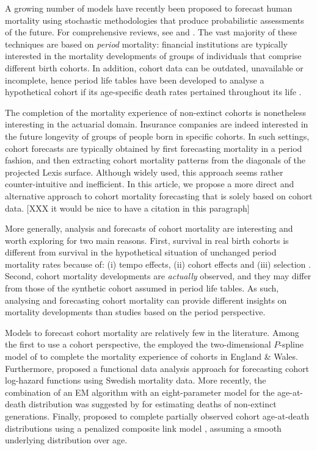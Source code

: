 \documentclass[11pt, a4paper]{article}
\begin{document}
A growing number of models have recently been proposed to forecast human mortality using stochastic methodologies that produce probabilistic assessments of the future. For comprehensive reviews, see \cite{booth2006demographic} and \cite{shang2011point}. The vast majority of these techniques are based on \textit{period} mortality: financial institutions are typically interested in the mortality developments of groups of individuals that comprise different birth cohorts. In addition, cohort data can be outdated, unavailable or incomplete, hence period life tables have been developed to analyse a hypothetical cohort if its age-specific death rates pertained throughout its life \citep{preston2001demogr}.
 
The completion of the mortality experience of non-extinct cohorts is nonetheless interesting in the actuarial domain. Insurance companies are indeed interested in the future longevity of groups of people born in specific cohorts. In such settings, cohort forecasts are typically obtained by first forecasting mortality in a period fashion, and then extracting cohort mortality patterns from the diagonals of the projected Lexis surface. Although widely used, this approach seems rather counter-intuitive and inefficient. In this article, we propose a more direct and alternative approach to cohort mortality forecasting that is solely based on cohort data. [XXX it would be nice to have a citation in this paragraph]

More generally, analysis and forecasts of cohort mortality are interesting and worth exploring for two main reasons. First, survival in real birth cohorts is different from survival in the hypothetical situation of unchanged period mortality rates because of: (i) tempo effects, (ii) cohort effects and (iii) selection \cite[for a full discussion, see][Sect.~2]{borgan2018cohort}. Second, cohort mortality developments are \textit{actually} observed, and they may differ from those of the synthetic cohort assumed in period life tables. As such, analysing and forecasting cohort mortality can provide different insights on mortality developments than studies based on the period perspective.  

Models to forecast cohort mortality are relatively few in the literature. Among the first to use a cohort perspective, the \cite{cmi2007stochastic} employed the two-dimensional $P$-spline model of \cite{currie2004smoothing} to complete the mortality experience of cohorts in England \& Wales. Furthermore, \cite{chiou2009modeling} proposed a functional data analysis approach for forecasting cohort log-hazard functions using Swedish mortality data. More recently, the combination of an EM algorithm with an eight-parameter model for the age-at-death distribution was suggested by \cite{zanotto2017reconstruction} for estimating 
deaths of non-extinct generations. Finally, \cite{rizzi2019forecasting} proposed to complete partially observed cohort age-at-death distributions using a penalized composite link model \citep{eilers2007ill}, assuming a smooth underlying distribution over age. 
\end{document}
